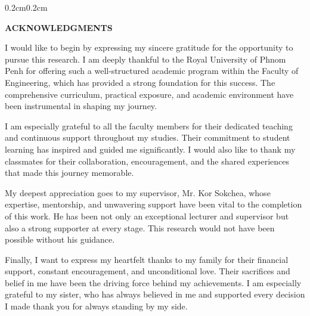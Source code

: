 \begin{adjustwidth}{0.2cm}{0.2cm}
\englishfont\fontsize{13.5pt}{17pt}\selectfont 


\begin{center}
    {\englishfont\fontsize{14pt}{21pt}\selectfont \textbf{ACKNOWLEDGMENTS} \par}
\end{center}
\label{acknowledgements}

\vspace{0.1cm}
\setlength{\parindent}{0pt}
\vspace{0.3cm}


{\large I would like to begin by expressing my sincere gratitude for the opportunity to pursue this research. I am deeply thankful to the Royal University of Phnom Penh for offering such a well-structured academic program within the Faculty of Engineering, which has provided a strong foundation for this success. The comprehensive curriculum, practical exposure, and academic environment have been instrumental in shaping my journey.

\vspace{0.5cm}
I am especially grateful to all the faculty members for their dedicated teaching and continuous support throughout my studies. Their commitment to student learning has inspired and guided me significantly. I would also like to thank my classmates for their collaboration, encouragement, and the shared experiences that made this journey memorable.

\vspace{0.5cm}
My deepest appreciation goes to my supervisor, Mr. Kor Sokchea, whose expertise, mentorship, and unwavering support have been vital to the completion of this work. He has been not only an exceptional lecturer and supervisor but also a strong supporter at every stage. This research would not have been possible without his guidance.

\vspace{0.5cm}
Finally, I want to express my heartfelt thanks to my family for their financial support, constant encouragement, and unconditional love. Their sacrifices and belief in me have been the driving force behind my achievements. I am especially grateful to my sister, who has always believed in me and supported every decision I made thank you for always standing by my side.

\par}

\end{adjustwidth}
